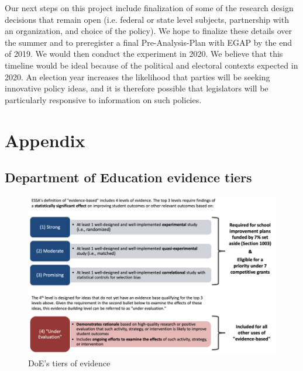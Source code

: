 \documentclass[12pt,final,fleqn]{article}
\theoremstyle{plain}
\begin{document}
Our next steps on this project include finalization of some of the research design decisions that remain open (i.e. federal or state level subjects, partnership with an organization, and choice of the policy). We hope to finalize these details over the summer and to preregister a final Pre-Analysis-Plan with EGAP by the end of 2019. We would then conduct the experiment in 2020. We believe that this timeline would be ideal because of the political and electoral contexts expected in 2020. An election year increases the likelihood that parties will be seeking innovative policy ideas, and it is therefore possible that legislators will be particularly responsive to information on such policies. 



\clearpage
\pagebreak


\pagebreak

\appendix
\setcounter{table}{0}
\setcounter{figure}{0}
\renewcommand\thetable{\Alph{section}.\arabic{table}}
\renewcommand\thefigure{\Alph{section}.\arabic{figure}}
\section{Appendix} \label{Appendix}

\subsection{Department of Education evidence tiers} \label{sec: DoE}
\begin{figure}[!htb]
\includegraphics{../figs/doe_tiers.png}
\bigbreak
\caption{DoE's tiers of evidence}
\label{fig: doe_tiers}
\end{figure}
\end{document}

